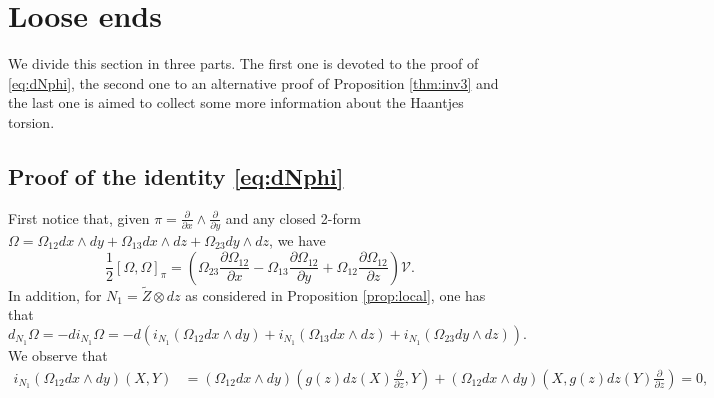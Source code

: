 \documentclass[12pt]{article}
\begin{document}
\section{Loose ends}\label{sec:Appendix}

We divide this section in three parts. The first one is devoted to the proof of \eqref{eq:dNphi},
the second one to an alternative proof of 
Proposition \ref{thm:inv3}  and the last one is aimed to collect some more information about the Haantjes torsion.

\subsection{Proof of the identity \eqref{eq:dNphi}}\label{subsec:app1}
First notice that, given $\pi=\frac{\partial}{\partial x}\wedge\frac{\partial}{\partial y}$  and any closed 2-form 
$\Omega=\Omega_{12}dx\wedge dy+\Omega_{13}dx\wedge dz+\Omega_{23}dy\wedge dz$, we have
\[
\frac{1}{2}\left[\Omega,\Omega\right]_{\pi}=\left(\Omega_{23}\frac{\partial\Omega_{12}}{\partial x}-\Omega_{13}\frac{\partial\Omega_{12}}{\partial y}+\Omega_{12}\frac{\partial\Omega_{12}}{\partial z}\right)\mathcal V.
\]
In addition, for $N_1=\widetilde{Z}\otimes dz$ as considered in %
Proposition \ref{prop:local}, one has that
\begin{equation}\label{eq: d_N1Omega} %
d_{N_1}\Omega=-di_{N_1}\Omega=-d\left(i_{N_1}(\Omega_{12}dx\wedge dy)+i_{N_1}(\Omega_{13}dx\wedge dz)+i_{N_1}(\Omega_{23}dy\wedge dz)\right).
\end{equation}
We observe that
\begin{align*}
i_{N_1}(\Omega_{12}dx\wedge dy)(X,Y)%
 &=(\Omega_{12}dx\wedge dy)\left(g(z)dz(X)\frac{\partial}{\partial z},Y\right)+(\Omega_{12}dx\wedge dy)\left(X,g(z)dz(Y)\frac{\partial}{\partial z}\right)=0,
\end{align*}
\end{document}
